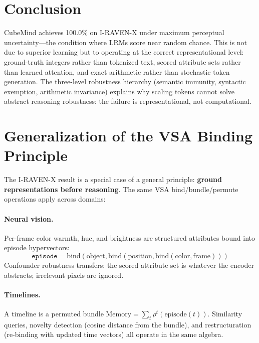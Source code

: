 \documentclass{article}
\begin{document}
\section{Conclusion}

CubeMind achieves 100.0\% on I-RAVEN-X under maximum perceptual uncertainty---the condition where LRMs score near random chance. This is not due to superior learning but to operating at the correct representational level: ground-truth integers rather than tokenized text, scored attribute sets rather than learned attention, and exact arithmetic rather than stochastic token generation. The three-level robustness hierarchy (semantic immunity, syntactic exemption, arithmetic invariance) explains why scaling tokens cannot solve abstract reasoning robustness: the failure is representational, not computational.

\newpage
\appendix

\section{Generalization of the VSA Binding Principle}
\label{app:generalization}

The I-RAVEN-X result is a special case of a general principle: \textbf{ground representations before reasoning}. The same VSA bind/bundle/permute operations apply across domains:

\paragraph{Neural vision.} Per-frame color warmth, hue, and brightness are structured attributes bound into episode hypervectors:
\[\texttt{episode} = \text{bind}(\text{object}, \text{bind}(\text{position}, \text{bind}(\text{color}, \text{frame})))\]
Confounder robustness transfers: the scored attribute set is whatever the encoder abstracts; irrelevant pixels are ignored.

\paragraph{Timelines.} A timeline is a permuted bundle $\text{Memory} = \sum_t \rho^t(\text{episode}(t))$. Similarity queries, novelty detection (cosine distance from the bundle), and restructuration (re-binding with updated time vectors) all operate in the same algebra.
\end{document}
